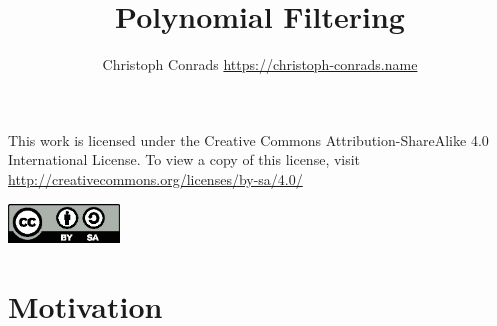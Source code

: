 \documentclass[%
	paper=a4,
	fontsize=10pt,
	DIV11,BCOR10mm,
	numbers=noenddot,
	abstract=yes
]{scrartcl}
\title{Polynomial Filtering}
\author{Christoph Conrads {\small \url{https://christoph-conrads.name}}}
\theoremstyle{definition}
\begin{document}
\maketitle

\begin{center}
	\begin{minipage}{0.8\textwidth}
		This work is licensed under the Creative Commons Attribution-ShareAlike
		4.0 International License. To view a copy of this license, visit \\
		\url{http://creativecommons.org/licenses/by-sa/4.0/}
	\end{minipage}

	\vspace{1\baselineskip}

	\includegraphics[width=8em]{creative-commons-by-sa}
\end{center}



\section{Motivation}
\end{document}
